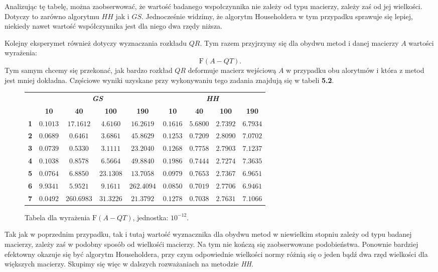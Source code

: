 Analizując tę tabelę, można zaobserwować, że wartość badanego wspołczynnika nie zależy od typu macierzy, zależy
zaś od jej wielkości. Dotyczy to zarówno algorytmu $HH$ jak i $GS$. Jednocześnie widzimy, że algorytm Householdera
w tym przypadku sprawuje się lepiej, niekiedy nawet wartość współczynnika jest dla niego dwa rzędy niższa. 

Kolejny eksperymet również dotyczy wyznaczania rozkładu $QR$. Tym razem przyjrzymy się dla obydwu metod
i danej macierzy $A$ wartości wyrażenia:
$$\mathrm{F}(A-QT).$$
Tym samym chcemy się przekonać, jak bardzo rozkład $QR$ deformuje macierz wejściową $A$ w przypadku obu alorytmów
i która z metod jest mniej dokładna. Częściowe wyniki uzyskane przy wykonywaniu tego zadania znajdują się w tabeli
\textbf{5.2}.
\begin{figure}[h!tb]
\begin{center}
\begin{tabular}{|l||c|c|c|c||c|c|c|c|}
\hline
\multirow{2}{*}{} & \multicolumn{4}{|c||}{\textbf{\textit{GS}}} & \multicolumn{4}{|c|}{\textbf{\textit{HH}}}\\
\cline{2-9}
&\textbf{10} & \textbf{40} & \textbf{100} & \textbf{190} & \textbf{10} & \textbf{40} & \textbf{100} & \textbf{190} \\
\hline
\hline
\textbf{1} & $0.1013$ & $17.1612$ & $4.6160$ & $16.2619$ & $0.1616$ & $5.6800$ & $2.7392$ & $6.7934$ \\
\hline
\textbf{2} & $0.0689$ & $0.6461$ & $3.6861$ & $45.8629$ & $0.1253$ & $0.7209$ & $ 2.8090$ & $7.0702$ \\
\hline
\textbf{3} & $0.0739$ & $0.5330$ & $3.1111$ & $23.2040$ & $0.1268$ & $0.7758$ & $2.7903$ & $7.1237$ \\
\hline
\textbf{4} & $0.1038$ & $0.8578$ & $6.5664$ & $49.8840$ & $0.1986$ & $0.7444$ & $2.7274$ & $7.3635$ \\
\hline
\textbf{5} & $0.0764$ & $6.8850$ & $23.1308$ & $13.7058$ & $0.0979$ & $0.7653$ & $2.7367$ & $6.9651$ \\
\hline
\textbf{6} & $9.9341$ & $5.9521$ & $9.1611$ & $262.4094$ & $0.0850$ & $0.7019$ & $2.7706$ & $6.9461$ \\
\hline
\textbf{7} & $0.0492$ & $260.6983$ & $31.3226$ & $21.3792$ & $0.1278$ & $0.7038$ & $2.7631$ & $7.1066$ \\
\hline
\end{tabular}
\caption{Tabela dla wyrażenia $\mathrm{F}(A-QT)$, jednostka: $10^{-12}$.} 
\end{center}
\end{figure}
Tak jak w poprzednim przypadku, tak i tutaj wartość wyznacznika dla obydwu metod w niewielkim stopniu
zależy od typu badanej macierzy, zależy zaś w podobny sposób od wielkośći macierzy. Na tym nie kończą
się zaobserwowane podobieństwa. Ponownie bardziej efektowny okazuje się być algorytm Householdera, przy
czym odpowiednie wielkości normy różnią się o jeden bądź dwa rzęd wielkości dla większych macierzy. Skupimy
się więc w dalszych rozważaniach na metodzie \textit{HH}.
 



